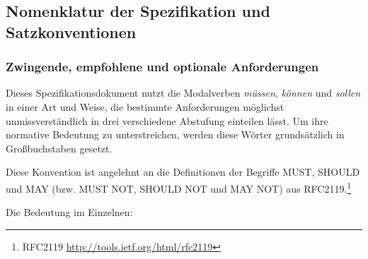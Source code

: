 \documentclass[,a4paper]{article}
\begin{document}
\subsection{Nomenklatur der Spezifikation und
Satzkonventionen}\label{nomenklatur-der-spezifikation-und-satzkonventionen}

\subsubsection{Zwingende, empfohlene und optionale
Anforderungen}\label{mussux5fsollux5fdarf}

Dieses Spezifikationsdokument nutzt die Modalverben \emph{müssen},
\emph{können} und \emph{sollen} in einer Art und Weise, die bestimmte
Anforderungen möglichst unmissverständlich in drei verschiedene
Abstufung einteilen lässt. Um ihre normative Bedeutung zu
unterstreichen, werden diese Wörter grundsätzlich in Großbuchstaben
gesetzt.

Diese Konvention ist angelehnt an die Definitionen der Begriffe MUST,
SHOULD und MAY (bzw. MUST NOT, SHOULD NOT und MAY NOT) aus
RFC2119.\footnote{RFC2119 \url{http://tools.ietf.org/html/rfc2119}}

Die Bedeutung im Einzelnen:
\end{document}
